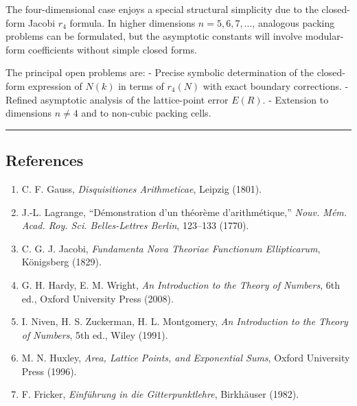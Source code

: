 \documentclass[a4paper,11pt]{article}
\theoremstyle{definition}
\providecommand{\tightlist}{\setlength{\itemsep}{0pt}\setlength{\parskip}{0pt}}
\begin{document}
The four-dimensional case enjoys a special structural simplicity due to
the closed-form Jacobi \(r_4\) formula. In higher dimensions
\(n = 5, 6, 7, \ldots\), analogous packing problems can be formulated,
but the asymptotic constants will involve modular-form coefficients
without simple closed forms.

The principal open problems are: - Precise symbolic determination of the
closed-form expression of \(N(k)\) in terms of \(r_4(N)\) with exact
boundary corrections. - Refined asymptotic analysis of the lattice-point
error \(E(R)\). - Extension to dimensions \(n \neq 4\) and to non-cubic
packing cells.

\begin{center}\rule{0.5\linewidth}{0.5pt}\end{center}

\subsection{References}\label{references}

\begin{enumerate}
\def\labelenumi{\arabic{enumi}.}
\tightlist
\item
  C. F. Gauss, \emph{Disquisitiones Arithmeticae}, Leipzig (1801).
\item
  J.-L. Lagrange, ``Démonstration d'un théorème d'arithmétique,''
  \emph{Nouv. Mém. Acad. Roy. Sci. Belles-Lettres Berlin}, 123--133
  (1770).
\item
  C. G. J. Jacobi, \emph{Fundamenta Nova Theoriae Functionum
  Ellipticarum}, Königsberg (1829).
\item
  G. H. Hardy, E. M. Wright, \emph{An Introduction to the Theory of
  Numbers}, 6th ed., Oxford University Press (2008).
\item
  I. Niven, H. S. Zuckerman, H. L. Montgomery, \emph{An Introduction to
  the Theory of Numbers}, 5th ed., Wiley (1991).
\item
  M. N. Huxley, \emph{Area, Lattice Points, and Exponential Sums},
  Oxford University Press (1996).
\item
  F. Fricker, \emph{Einführung in die Gitterpunktlehre}, Birkhäuser
  (1982).
\end{enumerate}
\end{document}
